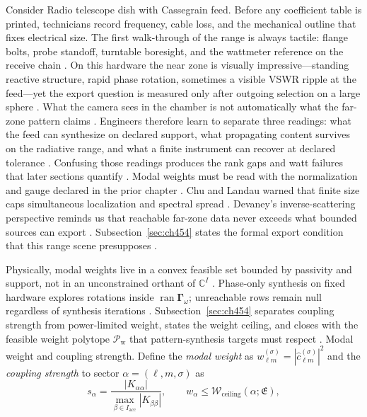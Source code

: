 \begin{physicalvignette}
Consider Radio telescope dish with Cassegrain feed. Before any coefficient table is printed, technicians record frequency, cable loss, and the mechanical outline that fixes electrical size. The first walk-through of the range is always tactile: flange bolts, probe standoff, turntable boresight, and the wattmeter reference on the receive chain \cite{hansen1988}.
On this hardware the near zone is visually impressive---standing reactive structure, rapid phase rotation, sometimes a visible VSWR ripple at the feed---yet the export question is measured only after outgoing selection on a large sphere \cite{harrington2001}. What the camera sees in the chamber is not automatically what the far-zone pattern claims \cite{stratton1941}.
Engineers therefore learn to separate three readings: what the feed can synthesize on declared support, what propagating content survives on the radiative range, and what a finite instrument can recover at declared tolerance \cite{devaney2004}. Confusing those readings produces the rank gaps and watt failures that later sections quantify \cite{pal2026}.
Modal weights must be read with the normalization and gauge declared in the prior chapter . 
Chu and Landau warned that finite size caps simultaneous localization and spectral spread \cite{chu1948}. Devaney's inverse-scattering perspective reminds us that reachable far-zone data never exceeds what bounded sources can export \cite{devaney2004}.
Subsection~\ref{sec:ch454} states the formal export condition that this range scene presupposes \cite{stratton1941}.
\end{physicalvignette}
Physically, modal weights live in a convex feasible set bounded by passivity and support, not in an unconstrained orthant of $\mathbb{C}^{I}$ \cite{stratton1941}. Phase-only synthesis on fixed hardware explores rotations inside $\operatorname{ran}\boldsymbol{\Gamma}_\omega$; unreachable rows remain null regardless of synthesis iterations \cite{devaney2004}. Subsection~\ref{sec:ch454} separates coupling strength from power-limited weight, states the weight ceiling, and closes with the feasible weight polytope $\mathcal{P}_{\mathrm{w}}$ that pattern-synthesis targets must respect \cite{hansen1988}.
Modal weight and coupling strength. Define the \emph{modal weight} as \(w_{\ell m}^{(\sigma)}=|\widehat{c}_{\ell m}^{(\sigma)}|^{2}\) and the
\emph{coupling strength} to sector \(\alpha=(\ell,m,\sigma)\) as
\begin{equation}
\label{eq:ch4.coupling-strength-def}
s_{\alpha}
=
\frac{
|K_{\alpha\alpha}|
}{
\max_{\beta\in I_{\mathrm{acc}}}|K_{\beta\beta}|
},
\qquad
w_{\alpha}
\le
\mathcal{W}_{\mathrm{ceiling}}(\alpha;\mathfrak{E}),
\end{equation}
